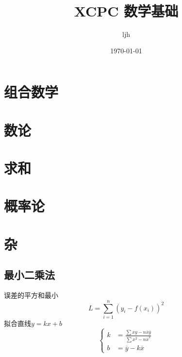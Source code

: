 \documentclass[12pt, a4paper, oneside]{ctexbook}
\title{{\Huge{\textbf{XCPC 数学基础}}}}
\author{ljh}
\date{\today}
\begin{document}
\maketitle

\setcounter{page}{1}

\newpage
{}
\setcounter{page}{1}
\tableofcontents
\newpage
\setcounter{page}{1}

\chapter{组合数学}


\chapter{数论}


\chapter{求和}


\chapter{概率论}



\chapter{杂}
\section{最小二乘法}
误差的平方和最小\\
$$
  L=\sum_{i=1}^{n} (y_i-f(x_i))^2
$$
拟合直线$y=kx+b$ 
$$
  \begin{cases}
    k&=\frac{\sum xy- n \overline{x}\overline{y}}{\sum x^2-n\overline{x}^2}\\
    b&=\overline{y}-k\overline{x}
  \end{cases}
$$
\end{document}

